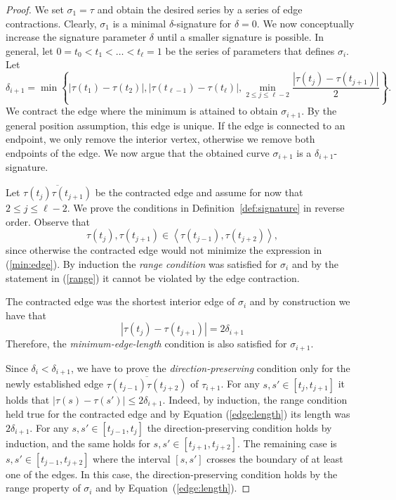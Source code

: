 \documentclass[11pt, letter]{article}
\newcommand{\defref}[1]{Definition~\ref{def:#1}}
\providecommand{\brc}[1]{\left\{ {#1} \right\}}
\providecommand{\cbrc}[1]{\left\langle{#1}\right\rangle}
\begin{document}
\begin{proof}
We set $\sigma_1=\tau$ and obtain the desired series by a series of edge contractions.  Clearly, $\sigma_1$ is a minimal $\delta$-signature for $\delta=0$. We now conceptually increase the signature parameter $\delta$ until a smaller signature is possible. In general, let $0=t_0 < t_1 < \dots < t_{\ell}=1$ be the series of parameters that defines $\sigma_i$. Let 
\begin{equation}\label{min:edge}
\delta_{i+1}=\min\brc{|\tau(t_1)-\tau(t_2)|,
|\tau(t_{\ell-1})-\tau(t_{\ell})|, \min_{2 \leq j \leq \ell-2}
\frac{|\tau(t_j)-\tau(t_{j+1})|}{2}}. 
\end{equation}
We contract the edge where the minimum is attained to obtain $\sigma_{i+1}$. By the general position assumption, this edge is unique. If the edge is connected to an endpoint, we only remove the interior vertex, otherwise we remove both endpoints of the edge. We now argue that the obtained curve $\sigma_{i+1}$ is a $\delta_{i+1}$-signature. 

Let $\overline{\tau(t_j)\tau(t_{j+1})}$ be the contracted edge and assume for now that $2\leq j \leq \ell-2 $.  We prove the conditions in \defref{signature} in reverse order.  Observe that 
\begin{equation}\label{range}
\tau(t_j),\tau(t_{j+1}) \in \cbrc{\tau(t_{j-1}),\tau(t_{j+2})},
\end{equation}
since otherwise the contracted edge would not minimize the expression in (\ref{min:edge}).  By induction the \emph{range condition} was satisfied for $\sigma_i$ and by the statement in (\ref{range}) it cannot be violated by the edge contraction.

The contracted edge was the shortest interior edge of $\sigma_i$ and by construction we have that
\begin{equation}\label{edge:length}
|\tau(t_j)-\tau(t_{j+1})| = 2\delta_{i+1}
\end{equation}
Therefore, the \emph{minimum-edge-length} condition is
also satisfied for $\sigma_{i+1}$. 

Since $\delta_i<\delta_{i+1}$, we have to prove the \emph{direction-preserving} condition only for the newly established edge $\overline{\tau(t_{j-1})\tau(t_{j+2})}$ of $\tau_{i+1}$. For any $s,s'\in [t_j,t_{j+1}]$ it holds that $|\tau(s)-\tau(s')|\leq 2\delta_{i+1}$. Indeed, by induction, the range condition held true for the contracted edge and by Equation (\ref{edge:length}) its length was $2\delta_{i+1}$. For any $s,s' \in [t_{j-1},t_j]$ the direction-preserving condition holds by induction, and the same holds for $s,s' \in [t_{j+1},t_{j+2}]$. The remaining case is $s,s' \in [t_{j-1},t_{j+2}]$ where the interval $[s,s']$  crosses the boundary of at least one of the edges. In this case, the direction-preserving condition holds by the range property of $\sigma_i$ and by Equation~(\ref{edge:length}).


\end{proof}
\end{document}
